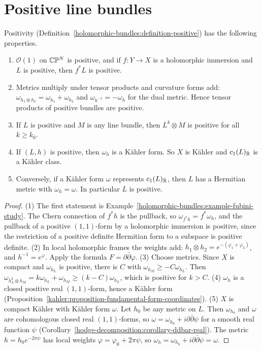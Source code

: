 \section{Positive line bundles}\label{kodaira:section-positive}

\begin{proposition}\label{kodaira:proposition-positivity-properties}
Positivity (Definition~\ref{holomorphic-bundles:definition-positive}) has the following properties.
\begin{enumerate}
\item $\mathcal{O}(1)$ on $\mathbb{C}\mathbb{P}^N$ is positive, and if $f \colon Y \to X$ is a holomorphic immersion and $L$ is positive, then $f^*L$ is positive.
\item Metrics multiply under tensor products and curvature forms add: $\omega_{h_1 \otimes h_2} = \omega_{h_1} + \omega_{h_2}$ and
$\omega_{h^{-1}} = -\omega_h$ for the dual metric. Hence tensor products of positive bundles are positive.
\item If $L$ is positive and $M$ is any line bundle, then $L^k \otimes M$ is positive for all $k \geq k_0$.
\item If $(L, h)$ is positive, then $\omega_h$ is a K\"ahler form. So $X$ is K\"ahler and $c_1(L)_{\mathbb{R}}$ is a K\"ahler class.
\item Conversely, if a K\"ahler form $\omega$ represents $c_1(L)_{\mathbb{R}}$, then $L$ has a Hermitian metric with $\omega_h = \omega$. In
particular $L$ is positive.
\end{enumerate}
\end{proposition}

\begin{proof}
(1) The first statement is Example~\ref{holomorphic-bundles:example-fubini-study}. The Chern connection of $f^*h$ is the pullback, so
$\omega_{f^*h} = f^*\omega_h$, and the pullback of a positive $(1,1)$-form by a holomorphic immersion is positive, since the restriction of a
positive definite Hermitian form to a subspace is positive definite. (2) In local holomorphic frames the weights add:
$h_1 \otimes h_2 = e^{-(\varphi_1 + \varphi_2)}$, and $h^{-1} = e^{\varphi}$. Apply the formula $F = \partial\bar\partial\varphi$. (3) Choose
metrics. Since $X$ is compact and $\omega_{h_L}$ is positive, there is $C$ with $\omega_{h_M} \geq -C\omega_{h_L}$. Then
$\omega_{h_L^k \otimes h_M} = k\omega_{h_L} + \omega_{h_M} \geq (k - C)\omega_{h_L}$, which is positive for $k > C$. (4) $\omega_h$ is a closed
positive real $(1,1)$-form, hence a K\"ahler form (Proposition~\ref{kahler:proposition-fundamental-form-coordinates}). (5) $X$ is compact
K\"ahler with K\"ahler form $\omega$. Let $h_0$ be any metric on $L$. Then $\omega_{h_0}$ and $\omega$ are cohomologous closed real
$(1,1)$-forms, so $\omega = \omega_{h_0} + i\partial\bar\partial\psi$ for a smooth real function $\psi$
(Corollary~\ref{hodge-decomposition:corollary-ddbar-real}). The metric $h = h_0e^{-2\pi\psi}$ has local weights $\varphi = \varphi_0 + 2\pi\psi$,
so $\omega_h = \omega_{h_0} + i\partial\bar\partial\psi = \omega$.
\end{proof}

